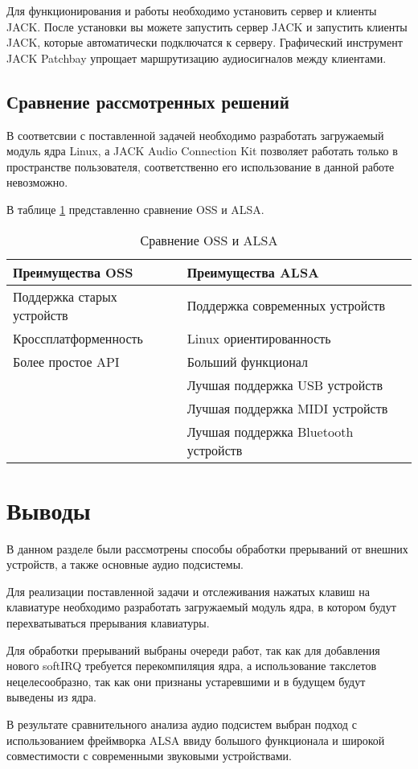 Для функционирования и работы необходимо установить сервер и клиенты JACK. После установки вы можете запустить сервер JACK и запустить клиенты JACK, которые автоматически подключатся к серверу. Графический инструмент JACK Patchbay упрощает маршрутизацию аудиосигналов между клиентами.

\subsection{Сравнение рассмотренных решений}

В соответсвии с поставленной задачей необходимо разработать загружаемый модуль ядра Linux, а JACK Audio Connection Kit позволяет работать только в пространстве пользователя, соответственно его использование в данной работе невозможно.

В таблице \ref{tabular:comparison} представленно сравнение OSS и ALSA.

\clearpage

\begin{table}[h!]
	\centering
	\caption{\label{tabular:comparison} Сравнение OSS и ALSA}
\begin{tabular}{|l|l|}
\hline
\textbf{Преимущества OSS} & \textbf{Преимущества ALSA} \\ \hline
Поддержка старых устройств & Поддержка современных устройств \\ \hline
Кроссплатформенность & Linux ориентированность \\ \hline
Более простое API & Больший функционал \\ \hline
 & Лучшая поддержка USB устройств \\ \hline
 & Лучшая поддержка MIDI устройств \\ \hline
 & Лучшая поддержка Bluetooth устройств \\ \hline
\end{tabular}
\end{table}

\section*{Выводы}

В данном разделе были рассмотрены способы обработки прерываний от внешних устройств, а также основные аудио подсистемы.

Для реализации поставленной задачи и отслеживания нажатых клавиш на клавиатуре необходимо разработать загружаемый модуль ядра, в котором будут перехватываться прерывания клавиатуры.

Для обработки прерываний выбраны очереди работ, так как для добавления нового softIRQ требуется перекомпиляция ядра, а использование такслетов нецелесообразно, так как они признаны устаревшими и в будущем будут выведены из ядра.

В результате сравнительного анализа аудио подсистем выбран подход с использованием фреймворка ALSA ввиду большого функционала и широкой совместимости с современными звуковыми устройствами.